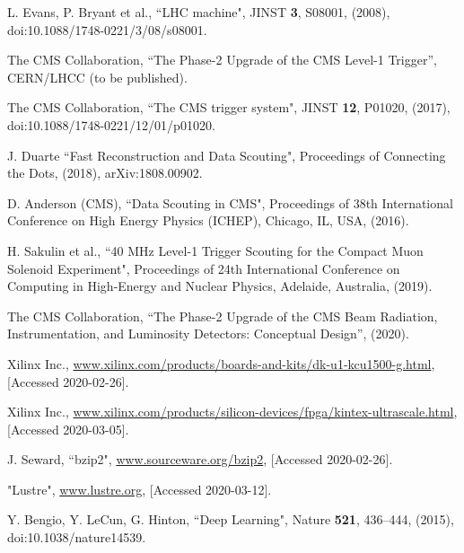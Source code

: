 \documentclass[10pt, paper=a4, UKenglish]{article}
\begin{document}

\begin{thebibliography}{99}


  L. Evans, P. Bryant et al.,
  “LHC machine",
  JINST {\bf 3}, S08001, (2008),
  doi:10.1088/1748-0221/3/08/s08001.

  The CMS Collaboration, 
  “The Phase-2 Upgrade of the CMS Level-1 Trigger”,
  CERN/LHCC (to be published).
    
  The CMS Collaboration,
  “The CMS trigger system",
  JINST {\bf 12}, P01020, (2017),
  doi:10.1088/1748-0221/12/01/p01020.

  J. Duarte
  “Fast Reconstruction and Data Scouting",
  Proceedings of Connecting the Dots, (2018),
  arXiv:1808.00902.

  D. Anderson (CMS),
  “Data Scouting in CMS",
  Proceedings of 38th International Conference on High Energy Physics (ICHEP), Chicago, IL, USA, (2016).

  H. Sakulin et al.,
  “40 MHz Level-1 Trigger Scouting for the Compact Muon Solenoid Experiment",
  Proceedings of 24th International Conference on Computing in High-Energy and Nuclear Physics, Adelaide, Australia, (2019).
  
  The CMS Collaboration,
  “The Phase-2 Upgrade of the CMS Beam Radiation, Instrumentation, and Luminosity Detectors: Conceptual Design”,
  (2020).

  Xilinx Inc.,
  \url{www.xilinx.com/products/boards-and-kits/dk-u1-kcu1500-g.html},
  [Accessed 2020-02-26].
  
  Xilinx Inc.,
  \url{www.xilinx.com/products/silicon-devices/fpga/kintex-ultrascale.html},
  [Accessed 2020-03-05].

  J. Seward,
  “bzip2",
  \url{www.sourceware.org/bzip2},
  [Accessed 2020-02-26].

  "Lustre",
  \url{www.lustre.org},
  [Accessed 2020-03-12].
  
  Y. Bengio, Y. LeCun, G. Hinton,
  “Deep Learning",
  Nature {\bf 521}, 436–444, (2015),
  doi:10.1038/nature14539.
  

\end{thebibliography}
\end{document}
